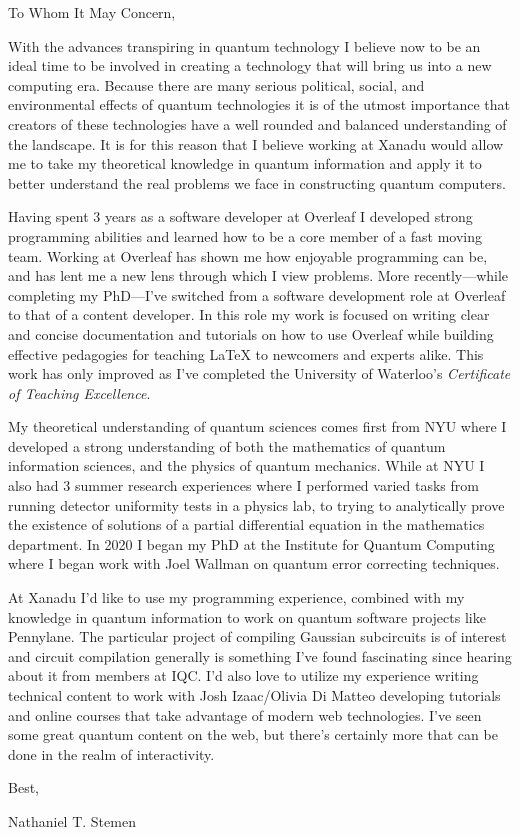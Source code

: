 \documentclass[12pt]{article}
\begin{document}
\noindent
To Whom It May Concern,

With the advances transpiring in quantum technology I believe now to be an ideal time to be involved in creating a technology that will bring us into a new computing era.
Because there are many serious political, social, and environmental effects of quantum technologies it is of the utmost importance that creators of these technologies have a well rounded and balanced understanding of the landscape.
It is for this reason that I believe working at Xanadu would allow me to take my theoretical knowledge in quantum information and apply it to better understand the real problems we face in constructing quantum computers.

Having spent 3 years as a software developer at Overleaf I developed strong programming abilities and learned how to be a core member of a fast moving team.
Working at Overleaf has shown me how enjoyable programming can be, and has lent me a new lens through which I view problems.
More recently---while completing my PhD---I've switched from a software development role at Overleaf to that of a content developer.
In this role my work is focused on writing clear and concise documentation and tutorials on how to use Overleaf while building effective pedagogies for teaching \LaTeX{} to newcomers and experts alike.
This work has only improved as I've completed the University of Waterloo's \emph{Certificate of Teaching Excellence}.

My theoretical understanding of quantum sciences comes first from NYU where I developed a strong understanding of both the mathematics of quantum information sciences, and the physics of quantum mechanics.
While at NYU I also had 3 summer research experiences where I performed varied tasks from running detector uniformity tests in a physics lab, to trying to analytically prove the existence of solutions of a partial differential equation in the mathematics department.
In 2020 I began my PhD at the Institute for Quantum Computing where I began work with Joel Wallman on quantum error correcting techniques.

At Xanadu I'd like to use my programming experience, combined with my knowledge in quantum information to work on quantum software projects like Pennylane.
The particular project of compiling Gaussian subcircuits is of interest and circuit compilation generally is something I've found fascinating since hearing about it from members at IQC.
I'd also love to utilize my experience writing technical content to work with Josh Izaac/Olivia Di Matteo developing tutorials and online courses that take advantage of modern web technologies.
I've seen some great quantum content on the web, but there's certainly more that can be done in the realm of interactivity.

\noindent
Best,

Nathaniel T. Stemen
\end{document}
